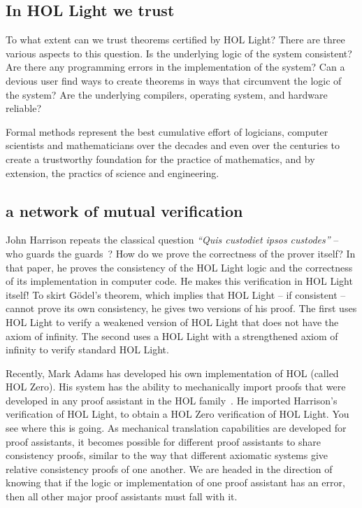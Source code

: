 \documentclass{llncs}
\begin{document}
 

\subsection{In HOL Light we trust}

To what extent can we trust theorems certified by HOL Light?  There
are three various aspects to this question.  Is the underlying logic
of the system consistent?  Are there any programming errors in the
implementation of the system?  Can a devious user find ways to create
theorems in ways that circumvent the logic of the system?  Are the
underlying compilers, operating system, and hardware reliable?

Formal methods represent the best cumulative effort of
logicians, computer scientists and mathematicians over the decades and
even over the centuries to create a trustworthy foundation for the
practice of mathematics, and by extension, the practics of science and
engineering.  

\subsection{a network of mutual verification}

John Harrison
repeats the classical question
{\it ``Quis custodiet ipsos custodes''} -- who guards the
guards~\cite{HaSelf}?  How do we prove the correctness of the prover
itself?  In that paper, he proves the consistency of the HOL Light
logic and the correctness of its implementation in computer code.  He
makes this verification in HOL Light itself!  To skirt G\"odel's
theorem, which implies that HOL Light -- if consistent -- cannot prove
its own consistency, he gives two versions of his proof.  The first
uses HOL Light to verify a weakened version of HOL Light that does not
have the axiom of infinity.  The second uses a HOL Light with a
strengthened axiom of infinity to verify standard HOL Light.

Recently, Mark Adams has developed his own implementation of HOL
(called HOL Zero).  His system has the ability to mechanically import
proofs that were developed in any proof assistant in the HOL
family~\cite{Adams}.  He imported Harrison's verification of HOL
Light, to obtain a HOL Zero verification of HOL Light.  You see where
this is going.  As mechanical translation capabilities are developed
for proof assistants, it becomes possible for different proof
assistants to share consistency proofs, similar to the way that
different axiomatic systems give relative consistency proofs of one
another.  We are headed in the direction of knowing that if the logic
or implementation of one proof assistant has an error, then all other major
proof assistants must fall with it.
\end{document}
